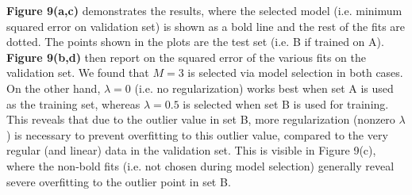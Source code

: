 \documentclass[10pt,psamsfonts]{amsart}
\theoremstyle{definition}
\theoremstyle{remark}
\numberwithin{equation}{section}
\begin{document}
{\bf Figure 9(a,c)} demonstrates the results, where the selected model (i.e. minimum squared error on validation set) is shown as a bold line and the rest of the fits are dotted. The points shown in the plots are the test set (i.e. B if trained on A). {\bf Figure 9(b,d)} then report on the squared error of the various fits on the validation set. We found that $M = 3$ is selected via model selection in both cases. On the other hand, $\lambda = 0$ (i.e. no regularization) works best when set A is used as the training set, whereas $\lambda = 0.5$ is selected when set B is used for training. This reveals that due to the outlier value in set B, more regularization (nonzero $\lambda$) is necessary to prevent overfitting to this outlier value, compared to the very regular (and linear) data in the validation set. This is visible in Figure 9(c), where the non-bold fits (i.e. not chosen during model selection) generally reveal severe overfitting to the outlier point in set B.
\end{document}
